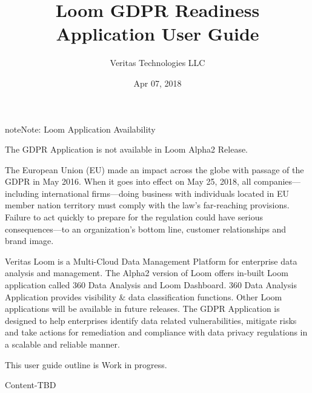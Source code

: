 \documentclass[letterpaper,10pt,english]{sphinxmanual}
\title{Loom GDPR Readiness Application User Guide}
\date{Apr 07, 2018}
\author{Veritas Technologies LLC}
\begin{document}
\maketitle
\sphinxtableofcontents
{}\label{\detokenize{appug/gdpr_app_ug::doc}}


\begin{sphinxadmonition}{note}{Note:}
Loom Application Availability

The GDPR Application is not available in Loom Alpha2 Release.
\end{sphinxadmonition}

The European Union (EU) made an impact across the globe with passage of the GDPR in May 2016. When it goes into effect on May 25, 2018, all companies—including international firms—doing business with individuals located in EU member nation territory must comply with the law’s far-reaching provisions. Failure to act quickly to prepare for the regulation could have serious consequences—to an organization’s bottom line, customer relationships and brand image.

Veritas Loom is a Multi-Cloud Data Management Platform for enterprise data analysis and management. The Alpha2 version of Loom offers in-built Loom application called 360 Data Analysis and Loom Dashboard.  360 Data Analysis Application provides visibility \& data classification functions. Other Loom applications will be available in future releases.  The GDPR Application is designed to help enterprises identify data related vulnerabilities, mitigate risks and take actions for remediation and compliance with data privacy regulations in a scalable and reliable manner.

This user guide outline is Work in progress.

Content-TBD



\renewcommand{\indexname}{Index}
\printindex
\end{document}

